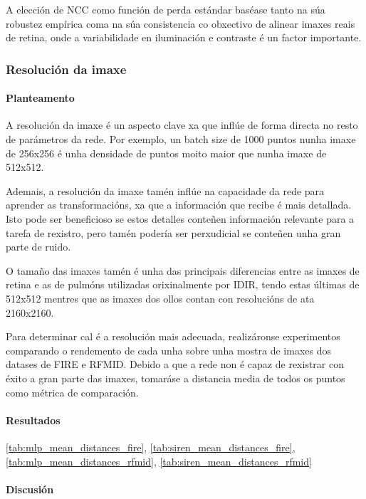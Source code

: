 A elección de NCC como función de perda estándar baséase tanto na súa robustez empírica coma na súa consistencia co obxectivo de alinear imaxes reais de retina, onde a variabilidade en iluminación e contraste é un factor importante.

\subsubsection{Resolución da imaxe}
\label{subsubsec:Resolución da imaxe}

\paragraph{Planteamento}
\label{par:Planteamento-resolution}

A resolución da imaxe é un aspecto clave xa que inflúe de forma directa no resto de parámetros da rede.
Por exemplo, un batch size de 1000 puntos nunha imaxe de 256x256 é unha densidade de puntos moito maior que nunha imaxe de 512x512.

Ademais, a resolución da imaxe tamén inflúe na capacidade da rede para aprender as transformacións, xa que a información que recibe é mais detallada. 
Isto pode ser beneficioso se estos detalles conteñen información relevante para a tarefa de rexistro, pero tamén podería ser perxudicial se conteñen unha gran parte de ruido.

O tamaño das imaxes tamén é unha das principais diferencias entre as imaxes de retina e as de pulmóns utilizadas orixinalmente por IDIR, tendo estas últimas de 512x512 mentres que as imaxes dos ollos contan con resolucións de ata 2160x2160.

Para determinar cal é a resolución mais adecuada, realizáronse experimentos comparando o rendemento de cada unha sobre unha mostra de imaxes dos datases de FIRE e RFMID.
Debido a que a rede non é capaz de rexistrar con éxito a gran parte das imaxes, tomaráse a distancia media de todos os puntos como métrica de comparación.

\paragraph{Resultados}
\label{par:Resultados-resolution}

\ref{tab:mlp_mean_distances_fire}, \ref{tab:siren_mean_distances_fire}, \ref{tab:mlp_mean_distances_rfmid}, \ref{tab:siren_mean_distances_rfmid}

\paragraph{Discusión}
\label{par:Discusion-resolution}

